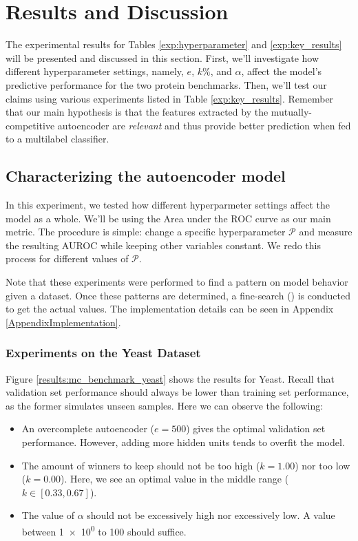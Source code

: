 \section{Results and Discussion}
\label{MCResults}

The experimental results for Tables \ref{exp:hyperparameter} and
\ref{exp:key_results} will be presented and discussed in this section. First,
we'll investigate how different hyperparameter settings, namely, $e$, $k\%$,
and $\alpha$, affect the model's predictive performance for the two protein
benchmarks. Then, we'll test our claims using various experiments listed in
Table \ref{exp:key_results}. Remember that our main hypothesis is that the
features extracted by the mutually-competitive autoencoder are
\textit{relevant} and thus provide better prediction when fed to a multilabel
classifier.

\newpage
\subsection{Characterizing the autoencoder model}

In this experiment, we tested how different hyperparmeter settings affect the
model as a whole. We'll be using the Area under the ROC curve as our main
metric. The procedure is simple: change a specific hyperparameter
$\mathcal{P}$ and measure the resulting AUROC while keeping other variables
constant. We redo this process for different values of $\mathcal{P}$. 

\par Note that these experiments were performed to find a pattern on model
behavior given a dataset. Once these patterns are determined, a fine-search
(\cite{bergstra2012random}) is conducted to get the actual values. The
implementation details can be seen in Appendix \ref{AppendixImplementation}.

\subsubsection{Experiments on the Yeast Dataset}

Figure \ref{results:mc_benchmark_yeast} shows the results for Yeast. Recall
that validation set performance should always be lower than training set
performance, as the former simulates unseen samples. Here we can observe the
following:

\begin{itemize}
  \item An overcomplete autoencoder ($e=500$) gives the optimal validation
  set performance. However, adding more hidden units tends to overfit the
  model.
  \item The amount of winners to keep should not be too high ($k=1.00$) nor
  too low ($k=0.00$). Here, we see an optimal value in the middle range
  ($k\in\left[0.33, 0.67\right]$).
  \item The value of $\alpha$ should not be excessively high nor excessively
  low. A value between \num{1e0} to \num{100} should suffice.
\end{itemize}

